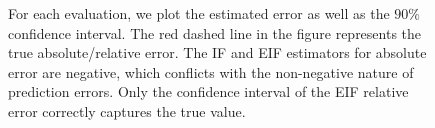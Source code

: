\documentclass{article}
\theoremstyle{plain}
\theoremstyle{definition}
\theoremstyle{plain}
\begin{document}
\begin{figure}[h]
{        %
        For each evaluation, we plot the estimated error as well as the $90\%$ confidence interval.
        The red dashed line in the figure represents the true absolute/relative error.
        The IF and EIF estimators for absolute error are negative, which conflicts with the non-negative nature of prediction errors. 
        Only the confidence interval of the EIF relative error correctly captures the true value.
        }
    \label{fig:inaccurate nuisance function estimator}
\end{figure}


\end{document}
